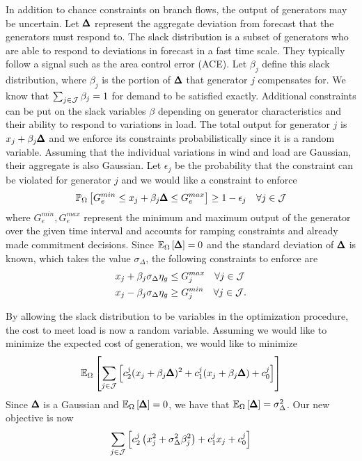 In addition to chance constraints on branch flows, the output of generators may be uncertain.  Let $\pmb{\Delta}$ represent the aggregate deviation from forecast that the generators must respond to.   The slack distribution is a subset of generators who are able to respond to deviations in forecast in a fast time scale.  They typically follow a signal such as the area control error (ACE).  Let $\beta_j$ define this slack distribution, where $\beta_j$ is the portion of $\pmb{\Delta}$ that generator $j$ compensates for.  We know that $\sum_{j \in \mathcal{J}} \beta_j =1$ for demand to be satisfied exactly.  Additional constraints can be put on the slack variables $\beta$ depending on generator characteristics and their ability to respond to variations in load.  The total output for generator $j$ is $x_j + \beta_j \pmb{\Delta} $
and we enforce its constraints probabilistically since it is a random variable.  Assuming that the individual variations in wind and load are Gaussian, their aggregate is also Gaussian.   Let $\epsilon_j$ be the probability that the constraint can be violated for generator $j$ and we would like a constraint to enforce
\begin{equation}\label{eq_cc_gen}
\bP{\Omega}{ G^{min}_e \leq x_j + \beta_j \rD  \leq G^{max}_e } \geq 1 - \epsilon_j \hspace{10px} \forall j \in \cJ 
\end{equation}
where $G^{min}_e, G^{max}_e$ represent the minimum and maximum output of the generator over the given time interval and accounts for ramping constraints and already made commitment decisions. Since $\mathbb{E}_{\Omega} \left[ \pmb{\Delta} \right] = 0$ and the standard deviation of $\pmb{\Delta}$ is known, which takes the value $\sigma_\Delta$, the following constraints to enforce  are
\begin{align*}
x_j + \beta_j \sigma_\Delta \eta_g &\leq G^{max}_j \hspace{10px} \forall j \in \cJ \\
x_j - \beta_j \sigma_\Delta \eta_g &\geq G^{min}_j \hspace{10px} \forall j \in \cJ .
\end{align*}

By allowing the slack distribution to be variables in the optimization procedure, the cost to meet load is now a random variable.  Assuming we would like to minimize the expected cost of generation, we would like to minimize
\begin{equation*}
\mathbb{E}_{\Omega} \left[  \sum_{j \in \mathcal{J}} \left[ c^j_2 (x_j+\beta_j \pmb{\Delta})^2 + c^j_1 (x_j + \beta_j \pmb{\Delta}) + c_0^j \right]  \right]
\end{equation*}
Since $\pmb{\Delta}$ is a Gaussian and $\mathbb{E}_{\Omega} \left[ \pmb{\Delta} \right] = 0$, we have that $\mathbb{E}_{\Omega} \left[ \pmb{\Delta} \right] = \sigma_\Delta^2$.  Our new objective is now
\begin{equation*}
\sum_{j \in \mathcal{J}} \left[  c_2^j \left(x_j^2 + \sigma_\Delta^2 \beta_j^2 \right) + c^j_1 x_j + c^j_0 \right]
\end{equation*}

